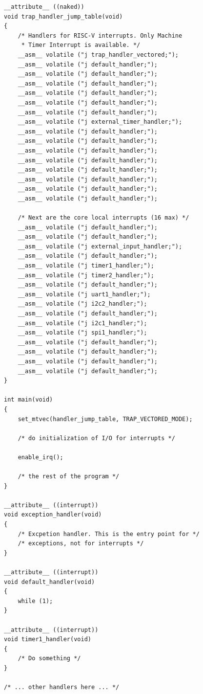\documentclass[12pt]{article}
\begin{document}
\begin{lstlisting}[]
__attribute__ ((naked))
void trap_handler_jump_table(void)
{
    /* Handlers for RISC-V interrupts. Only Machine
     * Timer Interrupt is available. */
    __asm__ volatile ("j trap_handler_vectored;");
    __asm__ volatile ("j default_handler;");
    __asm__ volatile ("j default_handler;");
    __asm__ volatile ("j default_handler;");
    __asm__ volatile ("j default_handler;");
    __asm__ volatile ("j default_handler;");
    __asm__ volatile ("j default_handler;");
    __asm__ volatile ("j external_timer_handler;");
    __asm__ volatile ("j default_handler;");
    __asm__ volatile ("j default_handler;");
    __asm__ volatile ("j default_handler;");
    __asm__ volatile ("j default_handler;");
    __asm__ volatile ("j default_handler;");
    __asm__ volatile ("j default_handler;");
    __asm__ volatile ("j default_handler;");
    __asm__ volatile ("j default_handler;");

    /* Next are the core local interrupts (16 max) */
    __asm__ volatile ("j default_handler;");
    __asm__ volatile ("j default_handler;");
    __asm__ volatile ("j external_input_handler;");
    __asm__ volatile ("j default_handler;");
    __asm__ volatile ("j timer1_handler;");
    __asm__ volatile ("j timer2_handler;");
    __asm__ volatile ("j default_handler;");
    __asm__ volatile ("j uart1_handler;");
    __asm__ volatile ("j i2c2_handler;");
    __asm__ volatile ("j default_handler;");
    __asm__ volatile ("j i2c1_handler;");
    __asm__ volatile ("j spi1_handler;");
    __asm__ volatile ("j default_handler;");
    __asm__ volatile ("j default_handler;");
    __asm__ volatile ("j default_handler;");
    __asm__ volatile ("j default_handler;");
}

int main(void)
{
    set_mtvec(handler_jump_table, TRAP_VECTORED_MODE);

    /* do initialization of I/O for interrupts */

    enable_irq();

    /* the rest of the program */
}

__attribute__ ((interrupt))
void exception_handler(void)
{
    /* Excpetion handler. This is the entry point for */
    /* exceptions, not for interrupts */
}

__attribute__ ((interrupt))
void default_handler(void)
{
    while (1);
}

__attribute__ ((interrupt))
void timer1_handler(void)
{
    /* Do something */
}

/* ... other handlers here ... */
\end{lstlisting}
\end{document}

